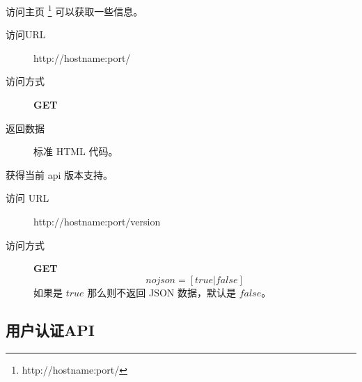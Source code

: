 \documentclass[UTF8]{ctexart}
\def\GET{\textbf{GET}}
\def \itemGET{\item[访问方式] \GET}
\begin{document}
    访问主页
    \footnote{http://hostname:port/}
    可以获取一些信息。
    \begin{description}
        \item[访问URL] http://hostname:port/
        \item[访问方式] \textbf{GET}
        \item[返回数据] 标准 HTML 代码。
    \end{description}
    
    获得当前 api 版本支持。
    \begin{description}
		\item[访问 URL] http://hostname:port/version
		\itemGET
		$$nojson=[true|false]$$
		如果是 $true$ 那么则不返回 JSON 数据，默认是 $false$。
	\end{description}
    
    
    
    
    
    
    
    
    
    \subsection{用户认证API}
    
    
    
    
    
    
    
    
    
    
    
\end{document}
